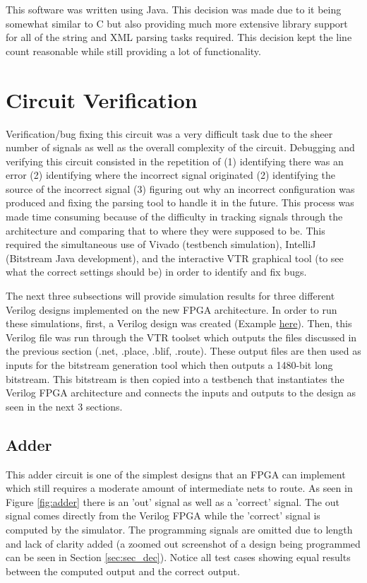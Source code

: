 \documentclass[12pt]{article}
\begin{document}
This software was written using Java. This decision was made due to it being somewhat
similar to C but also providing much more extensive library support for all of the
string and XML parsing tasks required. This decision kept the line count reasonable
while still providing a lot of functionality. 

\newpage
\section{Circuit Verification} \label{sec:verification}

Verification/bug fixing this circuit was a very difficult task due to the sheer number of signals
as well as the overall complexity of the circuit. Debugging and verifying this circuit
consisted in the repetition of (1) identifying there was an error (2) identifying where
the incorrect signal originated (2) identifying the source of the incorrect signal
(3) figuring out why an incorrect configuration was produced and fixing the parsing
tool to handle it in the future. This process was made time consuming because of
the difficulty in tracking signals through the architecture and comparing that to where
they were supposed to be. This required the simultaneous use of Vivado (testbench simulation),
IntelliJ (Bitstream Java development), and the interactive VTR graphical tool (to see what
the correct settings should be) in order to identify and fix bugs.

The next three subsections will provide simulation results for three different Verilog
designs implemented on the new FPGA architecture. In order to run these simulations,
first, a Verilog design was created
(Example \href{https://github.com/JosephPrachar/fpga/blob/master/vtr/seq_det.v}{here}).
Then, this Verilog file was run through the VTR toolset which outputs the files discussed
in the previous section (.net, .place, .blif, .route). These output files are then used as
inputs for the bitstream generation tool which then outputs a 1480-bit long bitstream.
This bitstream is then copied into a testbench that instantiates the Verilog FPGA architecture
and connects the inputs and outputs to the design as seen in the next 3 sections.

\subsection{Adder}

This adder circuit is one of the simplest designs that an FPGA can implement which still
requires a moderate amount of intermediate nets to route. As seen in Figure \ref{fig:adder}
there is an 'out' signal as well as a 'correct' signal. The out signal comes directly from the
Verilog FPGA while the 'correct' signal is computed by the simulator. The programming signals
are omitted due to length and lack of clarity added (a zoomed out screenshot of a design being programmed
can be seen in
Section \ref{sec:sec_dec}). Notice all test cases showing equal results between the computed output
and the correct output.
\end{document}
